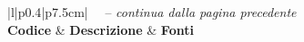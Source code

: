﻿\documentclass[a4paper,12pt]{article}
\begin{document}
{{\begin{longtable}{|l|p{}|p{7.5cm}|}
            {\tablename\ \thetable\ -- \textit{continua dalla pagina precedente}}                                                                                                                                                                                                                 \\
            \hline
            \textbf{Codice} & \textbf{Descrizione}                                                                            & \textbf{Fonti}                                                                                                                                                    \\
            \hline
            \endhead

            \hline
                                                                                                                                                                                                                                     \\
            \endfoot


\end{longtable}}}
\end{document}
